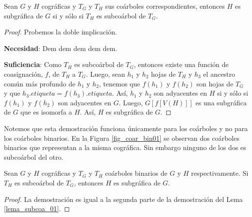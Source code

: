 \begin{lemma}\label{lema_subcoa_01}
    Sean $G$ y $H$ cográficas y $T_G$ y $T_H$ sus coárboles correspondientes, entonces $H$ es subgráfica de $G$ si y sólo si $T_H$ es subcoárbol de $T_G$.
\end{lemma}

\begin{proof}

    Probemos la doble implicación.

    \textbf{Necesidad}: Dem dem dem dem dem.

    \textbf{Suficiencia}: Como $T_H$ es subcoárbol de $T_G$, entonces existe una función de coasignación, $f$, de $T_H$ a $T_G$. Luego, sean $h_1$ y $h_2$ hojas de $T_H$ y $h_3$ el ancestro común más profundo de $h_1$ y $h_2$, tenemos que $f(h_1)$ y $f(h_2)$ son hojas de $T_G$ y que $h_3.etiqueta = f(h_3).etiqueta$. Así, $h_1$ y $h_2$ son adyacentes en $H$ si y sólo si $f(h_1)$ y $f(h_2)$ son adyacentes en $G$. Luego, $G[f[V(H)]]$ es una subgráfica de $G$ que es isomorfa a $H$. Así, $H$ es subgráfica de $G$.

\end{proof}

Notemos que esta demostración funciona únicamente para los coárboles y no para los coárboles binarios. En la Figura \ref{fig_coar_bin01} se observan dos coárboles binarios que representan a la misma cográfica. Sin embargo ninguno de los dos es subcoárbol del otro.

\begin{lemma}
    Sean $G$ y $H$ cográficas y $T_G$ y $T_H$ coárboles binarios de $G$ y $H$ respectivamente. Si $T_H$ es subcoárbol de $T_G$, entonces $H$ es subgráfica de $G$.
\end{lemma}

\begin{proof}
    La demostración es igual a la segunda parte de la demostración del Lema \ref{lema_subcoa_01}.
\end{proof}
